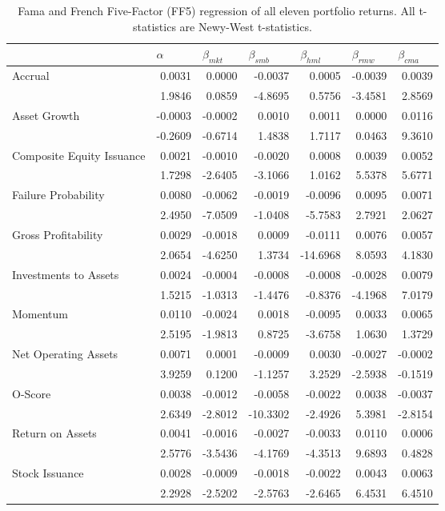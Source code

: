 \begin{table}[htbp]
\scriptsize
\caption{\newline Fama and French Five-Factor (FF5) regression of all eleven portfolio returns. All t-statistics are Newy-West t-statistics.}
\label{tab:ff5}
\begin{tabular}{@{}lrrrrrr@{}}
\toprule
& \multicolumn{1}{l}{$\alpha$} & \multicolumn{1}{l}{$\beta_{mkt}$} & \multicolumn{1}{l}{$\beta_{smb}$} & \multicolumn{1}{l}{$\beta_{hml}$} & \multicolumn{1}{l}{$\beta_{rmw}$} & \multicolumn{1}{l}{$\beta_{cma}$} \\ \midrule
\multirow{2}{*}{Accrual} & 0.0031 & 0.0000 & -0.0037 & 0.0005 & -0.0039 & 0.0039 \\
& 1.9846 & 0.0859 & -4.8695 & 0.5756 & -3.4581 & 2.8569 \\
\multirow{2}{*}{Asset Growth} & -0.0003 & -0.0002 & 0.0010 & 0.0011 & 0.0000 & 0.0116 \\
& -0.2609 & -0.6714 & 1.4838 & 1.7117 & 0.0463 & 9.3610 \\
\multirow{2}{*}{Composite Equity Issuance} & 0.0021 & -0.0010 & -0.0020 & 0.0008 & 0.0039 & 0.0052 \\
& 1.7298 & -2.6405 & -3.1066 & 1.0162 & 5.5378 & 5.6771 \\
\multirow{2}{*}{Failure Probability} & 0.0080 & -0.0062 & -0.0019 & -0.0096 & 0.0095 & 0.0071 \\
& 2.4950 & -7.0509 & -1.0408 & -5.7583 & 2.7921 & 2.0627 \\
\multirow{2}{*}{Gross Profitability} & 0.0029 & -0.0018 & 0.0009 & -0.0111 & 0.0076 & 0.0057 \\
& 2.0654 & -4.6250 & 1.3734 & -14.6968 & 8.0593 & 4.1830 \\
\multirow{2}{*}{Investments to Assets} & 0.0024 & -0.0004 & -0.0008 & -0.0008 & -0.0028 & 0.0079 \\
& 1.5215 & -1.0313 & -1.4476 & -0.8376 & -4.1968 & 7.0179 \\
\multirow{2}{*}{Momentum} & 0.0110 & -0.0024 & 0.0018 & -0.0095 & 0.0033 & 0.0065 \\
& 2.5195 & -1.9813 & 0.8725 & -3.6758 & 1.0630 & 1.3729 \\
\multirow{2}{*}{Net Operating Assets} & 0.0071 & 0.0001 & -0.0009 & 0.0030 & -0.0027 & -0.0002 \\
& 3.9259 & 0.1200 & -1.1257 & 3.2529 & -2.5938 & -0.1519 \\
\multirow{2}{*}{O-Score} & 0.0038 & -0.0012 & -0.0058 & -0.0022 & 0.0038 & -0.0037 \\
& 2.6349 & -2.8012 & -10.3302 & -2.4926 & 5.3981 & -2.8154 \\
\multirow{2}{*}{Return on Assets} & 0.0041 & -0.0016 & -0.0027 & -0.0033 & 0.0110 & 0.0006 \\
& 2.5776 & -3.5436 & -4.1769 & -4.3513 & 9.6893 & 0.4828 \\
\multirow{2}{*}{Stock Issuance} & 0.0028 & -0.0009 & -0.0018 & -0.0022 & 0.0043 & 0.0063 \\
& 2.2928 & -2.5202 & -2.5763 & -2.6465 & 6.4531 & 6.4510 \\ \bottomrule
\end{tabular}%
\end{table}

